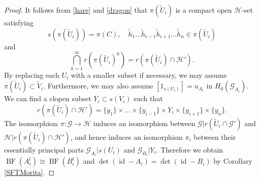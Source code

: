 \documentclass[11pt]{article}
\theoremstyle{definition}
\numberwithin{equation}{section}
\newcommand{\BF}{\operatorname{BF}}
\newcommand{\id}{\operatorname{id}}
\newcommand{\G}{\mathcal{G}}
\renewcommand{\H}{\mathcal{H}}
\begin{document}
\begin{proof}
It follows from \eqref{hare} and \eqref{dragon} that 
$\pi(\widetilde U_i)$ is a compact open $\H$-set satisfying 
\[
s(\pi(\widetilde U_i))=\pi(C),\quad 
\tilde h_1\dots\tilde h_{i-1}\tilde h_{i+1}\dots\tilde h_n
\in\pi(\widetilde U_i)
\]
and 
\[
\bigcap_{k=1}^\infty r(\pi(\widetilde U_i)^k)
=r(\pi(\widetilde U_i)\cap\H'). 
\]
By replacing each $U_i$ with a smaller subset if necessary, 
we may assume $\pi(\widetilde U_i)\subset\widetilde V_i$. 
Furthermore, we may also assume $[1_{s(U_i)}]=u_{A_i}$ in $H_0(\G_{A_i})$. 
We can find a clopen subset $Y_i\subset s(V_i)$ 
such that 
\[
r(\pi(\widetilde U_i)\cap\H')
=\{y_1\}\times\dots\times\{y_{i-1}\}\times Y_i
\times\{y_{i+1}\}\times\{y_n\}. 
\]
The isomorphism $\pi:\G\to\H$ induces an isomorphism 
between $\G|r(\widetilde U_i\cap\G')$ 
and $\H|r(\pi(\widetilde U_i)\cap\H')$, 
and hence induces an isomorphism $\pi_i$ 
between their essentially principal parts 
$\G_{A_i}|s(U_i)$ and $\G_{B_i}|Y_i$. 
Therefore we obtain $\BF(A_i^t)\cong\BF(B_i^t)$ and 
$\det(\id-A_i)=\det(\id-B_i)$ by Corollary \ref{SFTMorita}. 


\end{proof}
\end{document}
